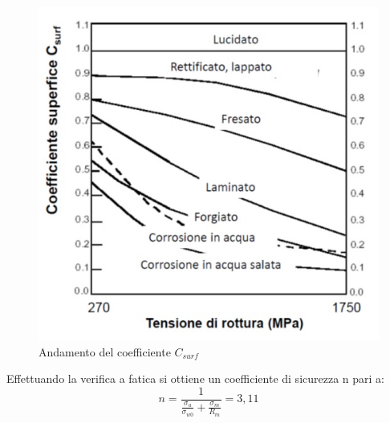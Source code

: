 \begin{figure}[h]
    \centering
    \includegraphics[scale=0.4]{Immagini/CurvaCLoad.png}
    \caption{Andamento del coefficiente $C_{surf}$}
    \label{fig:CurvaCLoad}
\end{figure}
Effettuando la verifica a fatica si ottiene un coefficiente di sicurezza n pari a:
\begin{equation}
    n=\frac{1}{\frac{\sigma_a}{\sigma_{w0}}+\frac{\sigma_m}{R_m}}=3,11
\end{equation}
